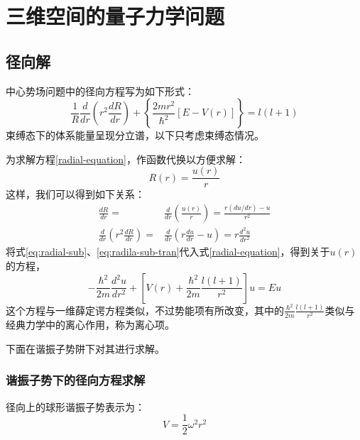 \chapter{三维空间的量子力学问题}
\section{径向解}
中心势场问题中的径向方程写为如下形式：
\begin{equation}
	\frac{1}{R}\frac{d}{dr}\left(r^2 \frac{dR}{dr}\right) + \left\{\frac{2mr^2}{\hbar^2}[ E-V(r) ]\right\}=  l(l+1)	\label{radial-equation}
\end{equation} 
束缚态下的体系能量呈现分立谱，以下只考虑束缚态情况。

为求解方程\eqref{radial-equation}，作函数代换以方便求解：
\begin{equation}
    R(r) = \frac{u(r)}{r}	\label{eq:radial-sub}
\end{equation} 
这样，我们可以得到如下关系：
\begin{equation}
	\begin{aligned}
		\frac{dR}{dr} =& \frac{d}{dr} \left( \frac{u(r)}{r} \right) = \frac{r (du/dr) - u}{r^2}	\\
		\frac{d}{dr}\left( r^2 \frac{dR}{dr} \right)  =& \frac{d}{dr}\left( r \frac{du}{dr} - u \right) = r \frac{d^2u}{dr^2} 
	\end{aligned}
	\label{eq:radila-sub-tran}
\end{equation} 
将式\eqref{eq:radial-sub}、\eqref{eq:radila-sub-tran}代入式\eqref{radial-equation}，得到关于$u(r)$的方程，
\begin{equation}
	-\frac{\hbar^2}{2m} \frac{d^2 u}{dr^2} + \left[ V(r) + \frac{\hbar^2}{2m}\frac{l(l+1)}{r^2} \right] u = Eu
\end{equation} 
这个方程与一维薛定谔方程类似，不过势能项有所改变，其中的$\frac{\hbar^2}{2m}\frac{l(l+1)}{r^2}$类似与经典力学中的离心作用，称为离心项。

下面在谐振子势阱下对其进行求解。

\subsection{谐振子势下的径向方程求解}

径向上的球形谐振子势表示为：
\begin{equation*}
	V = \frac{1}{2} \omega^{2} r^{2}
\end{equation*} 


